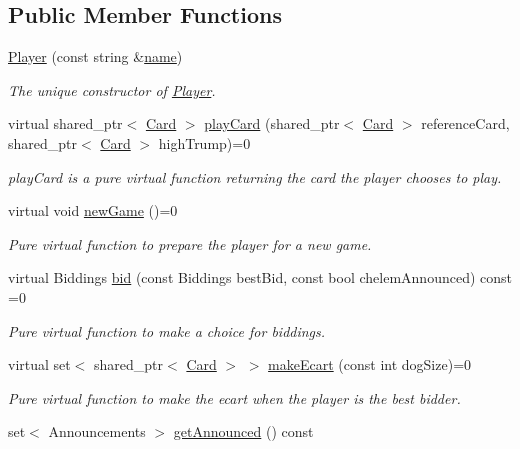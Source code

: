 \subsection*{Public Member Functions}
\begin{DoxyCompactItemize}
\item 
\hyperlink{classPlayer_a5a2790fccf10c30106370d910c96d317}{Player} (const string \&\hyperlink{classPlayer_acf0355128a99ee20ad9931b760fb2de1}{name})
\begin{DoxyCompactList}\small\item\em The unique constructor of \hyperlink{classPlayer}{Player}. \end{DoxyCompactList}\item 
virtual shared\-\_\-ptr$<$ \hyperlink{classCard}{Card} $>$ \hyperlink{classPlayer_aeba090a124bfd9a3666d2d793439cae0}{play\-Card} (shared\-\_\-ptr$<$ \hyperlink{classCard}{Card} $>$ reference\-Card, shared\-\_\-ptr$<$ \hyperlink{classCard}{Card} $>$ high\-Trump)=0
\begin{DoxyCompactList}\small\item\em play\-Card is a pure virtual function returning the card the player chooses to play. \end{DoxyCompactList}\item 
\hypertarget{classPlayer_a76a707ceb6f24b0a2a801434ee5a60ad}{virtual void \hyperlink{classPlayer_a76a707ceb6f24b0a2a801434ee5a60ad}{new\-Game} ()=0}\label{classPlayer_a76a707ceb6f24b0a2a801434ee5a60ad}

\begin{DoxyCompactList}\small\item\em Pure virtual function to prepare the player for a new game. \end{DoxyCompactList}\item 
virtual Biddings \hyperlink{classPlayer_a4bb658ca7b46f32a42578b884ad7fe82}{bid} (const Biddings best\-Bid, const bool chelem\-Announced) const =0
\begin{DoxyCompactList}\small\item\em Pure virtual function to make a choice for biddings. \end{DoxyCompactList}\item 
virtual set$<$ shared\-\_\-ptr$<$ \hyperlink{classCard}{Card} $>$ $>$ \hyperlink{classPlayer_a34c9e9f402c6a68d6e16caebdb93a33f}{make\-Ecart} (const int dog\-Size)=0
\begin{DoxyCompactList}\small\item\em Pure virtual function to make the ecart when the player is the best bidder. \end{DoxyCompactList}\item 
\hypertarget{classPlayer_a5573dd91ddb6fa8874d5a7f7a186f186}{set$<$ Announcements $>$ \hyperlink{classPlayer_a5573dd91ddb6fa8874d5a7f7a186f186}{get\-Announced} () const }\label{classPlayer_a5573dd91ddb6fa8874d5a7f7a186f186}


\end{DoxyCompactItemize}

